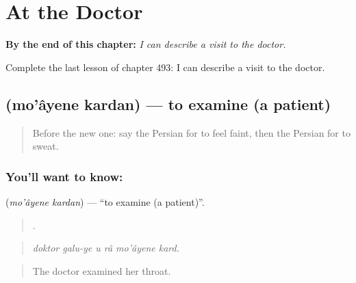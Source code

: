 
\chapter{At the Doctor}
\label{ch:fa-at-the-doctor}

\begin{chapteropening}
\textbf{By the end of this chapter:} \emph{I can describe a visit to the doctor.}

Complete the last lesson of chapter 493: I can describe a visit to the doctor.
\end{chapteropening}

\section[\texorpdfstring{\fa{معاینه} \fa{کردن} (mo'âyene kardan)}{معاینه کردن (mo'âyene kardan)}]{  (mo'âyene kardan) — to examine (a patient)}

\label{lesson:FA-C493-moayene-kardan}



\begin{quote}
Before the new one: say the Persian for to feel faint, then the Persian for to sweat.
\end{quote}

\subsection*{You'll want to know:  }
\textbf{ } (\emph{mo'âyene kardan}) — \textquotedblleft{}to examine (a patient)\textquotedblright{}.

\begin{quote}
     .
\end{quote}

\begin{quote}
\emph{doktor galu-ye u râ mo'âyene kard.}
\end{quote}

\begin{quote}
The doctor examined her throat.
\end{quote}


